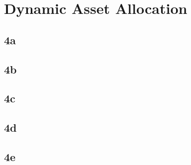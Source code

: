 \chapter{Dynamic Asset Allocation}

\section{4a}

\section{4b}

\section{4c}

\section{4d}

\section{4e}